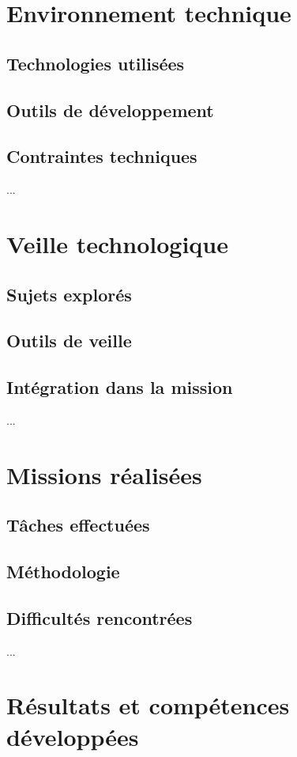 \documentclass[12pt,a4paper]{report}
\begin{document}
\chapter{Environnement technique}
\section{Technologies utilisées}
\section{Outils de développement}
\section{Contraintes techniques}
... %

\chapter{Veille technologique}
\section{Sujets explorés}
\section{Outils de veille}
\section{Intégration dans la mission}
... %

\chapter{Missions réalisées}
\section{Tâches effectuées}
\section{Méthodologie}
\section{Difficultés rencontrées}
... %

\chapter{Résultats et compétences développées}
\end{document}

